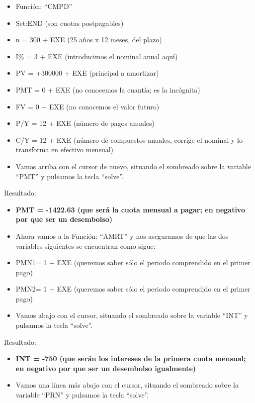 \documentclass[
  letterpaper,
  DIV=11,
  numbers=noendperiod]{scrreprt}
\begin{document}
\begin{tcolorbox}[enhanced jigsaw, left=2mm, opacityback=0, colback=white, breakable, arc=.35mm, bottomrule=.15mm, rightrule=.15mm, toprule=.15mm, leftrule=.75mm, colframe=quarto-callout-tip-color-frame]
\begin{minipage}[t]{\textwidth - 5.5mm}
\begin{itemize}
\item
  Función: ``CMPD''
\item
  Set:END (son cuotas postpagables)
\item
  n = 300 + EXE (25 años x 12 meses, del plazo)
\item
  I\% = 3 + EXE (introducimos el nominal anual aquí)
\item
  PV = +300000 + EXE (principal a amortizar)
\item
  PMT = 0 + EXE (no conocemos la cuantía; es la incógnita)
\item
  FV = 0 + EXE (no conocemos el valor futuro)
\item
  P/Y = 12 + EXE (número de pagos anuales)
\item
  C/Y = 12 + EXE (número de compuestos anuales, corrige el nominal y lo
  transforma en efectivo mensual)
\item
  Vamos arriba con el cursor de nuevo, situando el sombreado sobre la
  variable ``PMT'' y pulsamos la tecla ``solve''.
\end{itemize}

Resultado:

\begin{itemize}
\item
  \textbf{PMT = -1422.63 (que será la cuota mensual a pagar; en negativo
  por que ser un desembolso)}
\item
  Ahora vamos a la Función: ``AMRT'' y nos aseguramos de que las dos
  variables siguientes se encuentran como sigue:
\item
  PMN1= 1 + EXE (queremos saber sólo el periodo comprendido en el primer
  pago)
\item
  PMN2= 1 + EXE (queremos saber sólo el periodo comprendido en el primer
  pago)
\item
  Vamos abajo con el cursor, situando el sombreado sobre la variable
  ``INT'' y pulsamos la tecla ``solve''.
\end{itemize}

Resultado:

\begin{itemize}
\item
  \textbf{INT = -750 (que serán los intereses de la primera cuota
  mensual; en negativo por que ser un desembolso igualmente)}
\item
  Vamos una línea más abajo con el cursor, situando el sombreado sobre
  la variable ``PRN'' y pulsamos la tecla ``solve''.
\end{itemize}


\end{minipage}
\end{tcolorbox}
\end{document}
